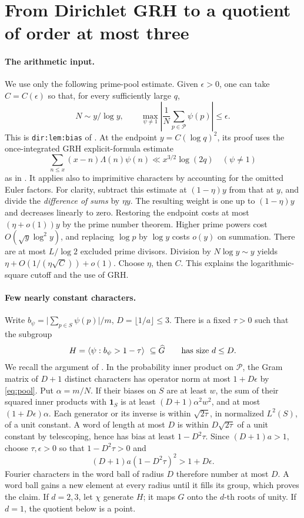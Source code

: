 \documentclass[11pt,letterpaper]{article}
\newcommand{\Pp}{\mathcal P}
\newcommand{\abs}[1]{\lvert#1\rvert}
\newcommand{\one}{\mathbf 1}
\begin{document}
\section{From Dirichlet GRH to a quotient of order at most three}
\paragraph{The arithmetic input.}
We use only the following prime-pool estimate. Given \(\epsilon>0\), one can take \(C=C(\epsilon)\) so that, for every sufficiently large \(q\),
\begin{equation}\label{eq:pool}
  N\sim y/\log y,\qquad
  \max_{\psi\ne1}\left|\frac 1N\sum_{p\in\Pp}\psi(p)\right|\le\epsilon .
\end{equation}
This is \texttt{dir:lem:bias} of \cite{article}. At the endpoint \(y=C(\log q)^2\), its proof uses the once-integrated GRH explicit-formula estimate
\[
 \sum_{n\le x}(x-n)\Lambda(n)\psi(n)\ll x^{3/2}\log(2q)
 \quad(\psi\ne1)
\]
as in \cite[Ch.~13]{MV}. It applies also to imprimitive characters by accounting for the omitted Euler factors. For clarity, subtract this estimate at \((1-\eta)y\) from that at \(y\), and divide the \emph{difference of sums} by \(\eta y\). The resulting weight is one up to \((1-\eta)y\) and decreases linearly to zero. Restoring the endpoint costs at most \((\eta+o(1))y\) by the prime number theorem. Higher prime powers cost \(O(\sqrt y\log^2 y)\), and replacing \(\log p\) by \(\log y\) costs \(o(y)\) on summation. There are at most \(L/\log 2\) excluded prime divisors. Division by \(N\log y\sim y\) yields \(\eta+O(1/(\eta\sqrt C))+o(1)\). Choose \(\eta\), then \(C\). This explains the logarithmic-square cutoff and the use of GRH.

\paragraph{Few nearly constant characters.}
Write \(b_\psi=\abs{\sum_{p\in S}\psi(p)}/m\), \(D=\lfloor 1/a\rfloor\le3\). There is a fixed \(\tau>0\) such that the subgroup
\[
 H=\langle\psi:b_\psi>1-\tau\rangle\ \subseteq\widehat G
             \qquad\hbox{has size } d\le D .
\]
We recall the argument of \cite{article,factor}. In the probability inner product on \(\Pp\), the Gram matrix of \(D+1\) distinct characters has operator norm at most \(1+D\epsilon\) by \eqref{eq:pool}. Put \(\alpha=m/N\). If their biases on \(S\) are at least \(w\), the sum of their squared inner products with \(\one_S\) is at least \((D+1)\alpha^2w^2\), and at most \((1+D\epsilon)\alpha\).
Each generator or its inverse is within \(\sqrt{2\tau}\), in normalized \(L^2(S)\), of a unit constant. A word of length at most \(D\) is within \(D\sqrt{2\tau}\) of a unit constant by telescoping, hence has bias at least \(1-D^2\tau\). Since \((D+1)a>1\), choose \(\tau,\epsilon>0\) so that \(1-D^2\tau>0\) and
\[
 (D+1)a(1-D^2\tau)^2>1+D\epsilon .
\]
Fourier characters in the word ball of radius \(D\) therefore number at most \(D\). A word ball gains a new element at every radius until it fills its group, which proves the claim. If \(d=2,3\), let \(\chi\) generate \(H\); it maps \(G\) onto the \(d\)-th roots of unity. If \(d=1\), the quotient below is a point.
\end{document}
